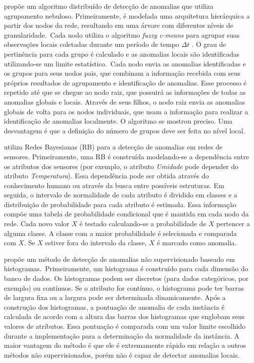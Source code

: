 \documentclass[cic,tc]{iiufrgs}
\begin{document}
\cite{DistributedFuzzy2013} propõe um algoritmo distribuído de detecção de anomalias que utiliza agrupamento nebuloso. Primeiramente, é modelada uma arquitetura hierárquica a partir dos nodos da rede, resultando em uma árvore com diferentes níveis de granularidade.~Cada nodo utiliza o algoritmo \textit{fuzzy c-means} para agrupar suas observações locais coletadas durante um período de tempo $\Delta t$ . O grau de pertinência para cada grupo é calculado e as anomalias locais são identificadas utilizando-se um limite estatístico.~Cada nodo envia as anomalias identificadas e os grupos para seus nodos pais, que combinam a informação recebida com seus próprios resultados de agrupamento e identificação de anomalias. Esse processo é repetido até que se chegue ao nodo raiz, que possuirá as informações de todas as anomalias globais e locais. Através de seus filhos, o nodo raiz envia as anomalias globais de volta para os nodos individuais, que usam a informação para realizar a identificação de anomalias localmente. O algoritmo se mostrou preciso. Uma desvantagem é que a definição do número de grupos deve ser feita no nível local.

\cite{BayesianBelief} utiliza Redes Bayesianas (RB) para a detecção de anomalias em redes de sensores. Primeiramente, uma RB é construída modelando-se a dependência entre os atributos dos sensores (por exemplo, o atributo \textit{Umidade} pode depender do atributo \textit{Temperatura}). Essa dependência pode ser obtida através do conhecimento humano ou através da busca entre possíveis estruturas. Em seguida, o intervalo de normalidade de cada atributo é dividido em classes e a distribuição de probabilidade para cada atributo é estimada. Essa informação compõe uma tabela de probabilidade condicional que é mantida em cada nodo da rede. Cada novo valor $X$ é testado calculando-se a probabilidade de $X$ pertencer a alguma classe. A classe com a maior probabilidade é selecionada e comparada com $X$. Se $X$ estiver fora do intervalo da classe, $X$ é marcado como anomalia.

\cite{hbos2012} propõe um método de detecção de anomalias não supervisionado baseado em histogramas.~Primeiramente, um histograma é construído para cada dimensão do banco de dados. Os histogramas podem ser discretos (para dados categóricos, por exemplo) ou contínuos. Se o atributo for contínuo, o histograma pode ter barras de largura fixa ou a largura pode ser determinada dinamicamente. Após a construção dos histogramas, a pontuação de anomalia de cada instância é calculada de acordo com a altura das barras dos histogramas que englobam seus valores de atributos. Essa pontuação é comparada com um valor limite escolhido durante a implementação para a determinação da normalidade da instância. A maior vantagem do método é que ele é extremamente rápido em relação a outros métodos não supervisionados, porém não é capaz de detectar anomalias locais.
\end{document}
